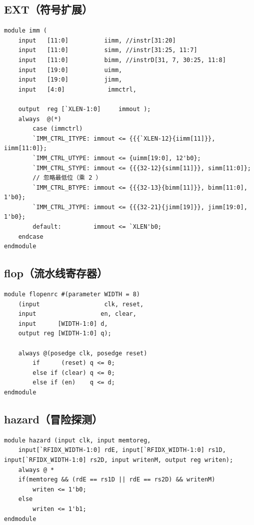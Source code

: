 \documentclass[UTF8,a4paper,autofakebold,15pt]{ctexart}
\begin{document}
\subsection{EXT（符号扩展）}

{\lstset{language=verilog}
	\begin{lstlisting}
module imm (
	input	[11:0]			iimm, //instr[31:20]
	input	[11:0]			simm, //instr[31:25, 11:7]
	input	[11:0]			bimm, //instrD[31, 7, 30:25, 11:8]
	input	[19:0]			uimm,
	input	[19:0]			jimm,
	input	[4:0]			 immctrl,
	
	output	reg [`XLEN-1:0] 	immout );
	always  @(*)
		case (immctrl)
		`IMM_CTRL_ITYPE: immout <= {{{`XLEN-12}{iimm[11]}}, iimm[11:0]};
		`IMM_CTRL_UTYPE: immout <= {uimm[19:0], 12'b0};
		`IMM_CTRL_STYPE: immout <= {{{32-12}{simm[11]}}, simm[11:0]};
		// 忽略最低位（乘 2 ）
		`IMM_CTRL_BTYPE: immout <= {{{32-13}{bimm[11]}}, bimm[11:0], 1'b0};
		`IMM_CTRL_JTYPE: immout <= {{{32-21}{jimm[19]}}, jimm[19:0], 1'b0};
		default:		 immout <= `XLEN'b0;
	endcase
endmodule
\end{lstlisting}}
\subsection{flop（流水线寄存器）}
{\lstset{language=verilog}
	\begin{lstlisting}
module flopenrc #(parameter WIDTH = 8)
	(input                  clk, reset,
	input                  en, clear,
	input      [WIDTH-1:0] d, 
	output reg [WIDTH-1:0] q);

	always @(posedge clk, posedge reset)
		if      (reset) q <= 0;
		else if (clear) q <= 0;
		else if (en)    q <= d;
endmodule
\end{lstlisting}}

\subsection{hazard（冒险探测）}
{\lstset{language=verilog}
	\begin{lstlisting}
module hazard (input clk, input memtoreg, 
	input[`RFIDX_WIDTH-1:0] rdE, input[`RFIDX_WIDTH-1:0] rs1D, input[`RFIDX_WIDTH-1:0] rs2D, input writenM, output reg writen);
	always @ *
	if(memtoreg && (rdE == rs1D || rdE == rs2D) && writenM)
		writen <= 1'b0;
	else
		writen <= 1'b1;
endmodule
\end{lstlisting}}
\end{document}
